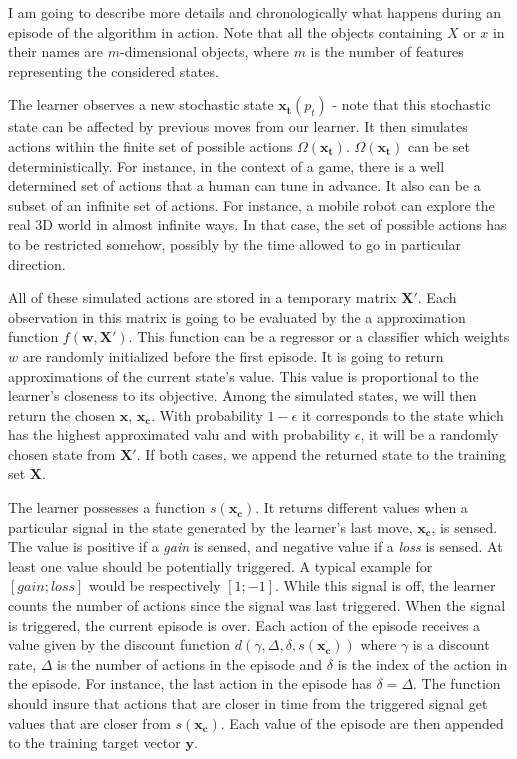 \documentclass[letterpaper, 10.5 pt, conference]{ieeeconf}
\newcommand{\B}[1]{\mathbf{#1}}
\begin{document}
I am going to describe more details and chronologically what happens during an episode of the algorithm in action. Note that all the objects containing $X$ or $x$ in their names are $m$-dimensional objects, where $m$ is the number of features representing the considered states.

The learner observes a new stochastic state $\B{x_t}(p_t)$ - note that this stochastic state can be affected by previous moves from our learner. It then simulates actions within the finite set of possible actions $\Omega(\B{x_t})$. $\Omega(\B{x_t})$ can be set deterministically. For instance, in the context of a game, there is a well determined set of actions that a human can tune in advance. It also can be a subset of an infinite set of actions. For instance, a mobile robot can explore the real 3D world in almost infinite ways. In that case, the set of possible actions has to be restricted somehow, possibly by the time allowed to go in particular direction.

All of these simulated actions are stored in a temporary matrix $\B{X'}$. Each observation in this matrix is going to be evaluated by the a approximation function $f(\B{w},\B{X'})$. This function can be a regressor or a classifier which weights $w$ are randomly initialized before the first episode. It is going to return approximations of the current state's value. This value is proportional to the learner's closeness to its objective. Among the simulated states, we will then return the chosen $\B{x}$, $\B{x_c}$. With probability $1-\epsilon$ it corresponds to the state which has the highest approximated valu and with probability $\epsilon$, it will be a randomly chosen state from $\B{X'}$. If both cases, we append the returned state to the training set $\B{X}$.

The learner possesses a function $s(\B{x_c})$. It returns different values when a particular signal in the state generated by the learner's last move, $\B{x_c}$, is sensed. The value is positive if a \textit{gain} is sensed, and negative value if a \textit{loss} is sensed. At least one value should be potentially triggered. A typical example for $[gain;loss]$ would be respectively $[1;-1]$. While this signal is off, the learner counts the number of actions since the signal was last triggered. When the signal is triggered, the current episode is over. Each action of the episode receives a value given by the discount function $d(\gamma, \Delta, \delta, s(\B{x_c}))$ where $\gamma$ is a discount rate, $\Delta$ is the number of actions in the episode and $\delta$ is the index of the action in the episode. For instance, the last action in the episode has $\delta=\Delta$. The function should insure that actions that are closer in time from the triggered signal get values that are closer from $s(\B{x_c})$. Each value of the episode are then appended to the training target vector $\B{y}$. 
\end{document}
